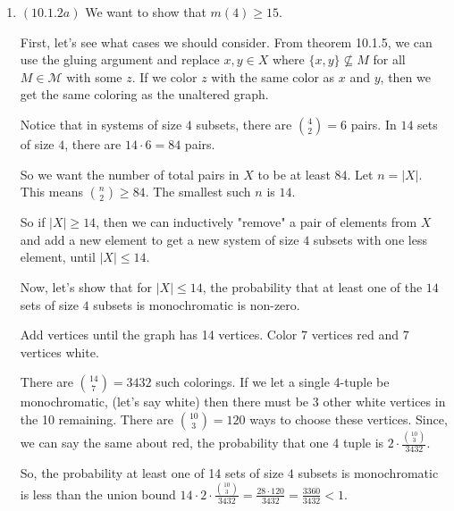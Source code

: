 \documentclass[12pt]{article}
\begin{document}

\begin{enumerate}[start=1,label={\bfseries Problem \arabic*:},leftmargin=1in] %
    \item $(10.1.2a)$ We want to show that $m(4) \geq 15$. 

    First, let's see what cases we should consider. From theorem 10.1.5, we can use the gluing argument and replace $x, y \in X$ where $\{x , y\} \not \subseteq M$ for all $M \in \mathcal{M}$ with some $z$. 
    If we color $z$ with the same color as $x$ and $y$, then we get the same coloring as the unaltered graph. 

    Notice that in systems of size $4$ subsets, there are $\binom{4}{2} = 6$ pairs. 
    In $14$ sets of size $4$, there are $14 \cdot 6 = 84$ pairs.

    So we want the number of total pairs in $X$ to be at least $84$. 
    Let $n = \left| X \right| $. This means $\binom{n}{2} \geq 84$. The smallest such $n$ is $14$.
    
    So if $\left| X \right| \geq 14$, then we can inductively "remove" a pair of elements from $X$ and add a new element to get a new system of size $4$ subsets with one less element, until $\left| X \right| \leq 14$. 

    Now, let's show that for $\left| X \right| \leq 14$, the probability that at least one of the $14$ sets of size $4$ subsets is monochromatic is non-zero. 

    Add vertices until the graph has 14 vertices. Color 7 vertices red and 7 vertices white. 

    There are $\binom{14}{7} = 3432$ such colorings. If we let a single 4-tuple be monochromatic, (let's say white) then there must be 3 other white vertices in the 10 remaining. There are $\binom{10}{3} = 120$ ways to choose these vertices.
    Since, we can say the same about red, the probability that one 4 tuple is $2 \cdot \frac{\binom{10}{3}}{3432}$. 

    So, the probability at least one of 14 sets of size $4$ subsets is monochromatic is less than the union bound $14 \cdot 2 \cdot \frac{\binom{10}{3}}{3432} = \frac{28 \cdot 120}{3432} = \frac{3360}{3432} < 1$.
    

\end{enumerate}
\end{document}
